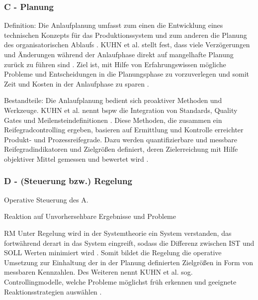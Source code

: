 \subsubsection*{C - Planung}

% 
% 

Definition: 
Die Anlaufplanung umfasst zum einen die Entwicklung eines technischen Konzepts für das Produktionssystem und zum anderen die Planung des organisatorischen Ablaufs \cite{Risse2002}. %
KUHN et al. stellt fest, dass viele Verzögerungen und Änderungen während der Anlaufphase direkt auf mangelhafte Planung zurück zu führen sind \cite[19]{Kuhn2002}. 
Ziel ist, mit Hilfe von Erfahrungswissen mögliche Probleme und Entscheidungen in die Planungsphase zu vorzuverlegen und somit Zeit und Kosten in der Anlaufphase zu sparen \cite{Risse2002}.  %

Bestandteile: 
Die Anlaufplanung bedient sich proaktiver Methoden und Werkzeuge. KUHN et al. nennt \gls{bspw} die Integration von Standards, Quality Gates und Meilensteindefinitionen \cite[19]{Kuhn2002}. 
Diese Methoden, die zusammen ein Reifegradcontrolling ergeben, basieren auf Ermittlung und Kontrolle erreichter Produkt- und Prozessreifegrade. Dazu werden quantifizierbare und messbare Reifegradindikatoren und Zielgrößen definiert, deren Zielerreichung mit Hilfe objektiver Mittel gemessen und bewertet wird \cite[62--63]{Schuh2008}. 

\subsubsection*{D - (Steuerung bzw.) Regelung}

Operative Steuerung des A.

Reaktion auf Unvorhersehbare Ergebnisse und Probleme

RM
Unter Regelung wird in der Systemtheorie ein System verstanden, das fortwährend derart in das System eingreift, sodass die Differenz zwischen IST und SOLL Werten minimiert wird \cite[136]{diniec60050}. Somit bildet die Regelung die operative Umsetzung zur Einhaltung der in der Planung definierten Zielgrößen in Form von messbaren Kennzahlen. 
Des Weiteren nennt KUHN et al. sog. Controllingmodelle, welche Probleme möglichst früh erkennen und geeignete Reaktionsstrategien auswählen \cite{Kuhn2002}. 




